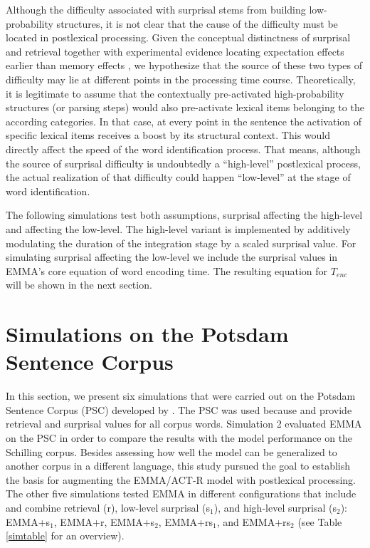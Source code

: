 Although the difficulty associated with surprisal stems from building low-probability structures, it is not clear that the cause of the difficulty must be located in postlexical processing.
Given the conceptual distinctness of surprisal and retrieval together with experimental evidence locating expectation effects earlier than memory effects \citep{Staub2010a,Vasishth2011}, we hypothesize that the source of these two types of difficulty may lie at different points in the processing time course.
Theoretically, it is legitimate to assume that the contextually pre-activated high-probability structures (or parsing steps) would also pre-activate lexical items belonging to the according categories. In that case, at every point in the sentence the activation of specific lexical items receives a boost by its structural context. This would directly affect the speed of the word identification process.
That means, although the source of surprisal difficulty is undoubtedly a ``high-level'' postlexical process, the actual realization of that difficulty could happen ``low-level'' at the stage of word identification.

The following simulations test both assumptions, surprisal affecting the  high-level and affecting the  low-level.  The high-level variant is implemented by additively modulating the duration of the integration stage by a scaled surprisal value. For simulating surprisal affecting the low-level we include the surprisal values in EMMA's core equation of word encoding time. The resulting equation for $T_{enc}$ will be shown in the next section.

\section{Simulations on the Potsdam Sentence Corpus} \label{sec:topics:psc}

In this section, we present six simulations that were carried out on the Potsdam Sentence Corpus (PSC) developed by \cite{Kliegl2004}. The PSC was used because \cite{Boston2008} and \cite{BostonHaleVasishth2011} provide retrieval and surprisal values for all corpus words.  Simulation 2 evaluated EMMA on the PSC in order to compare the results with the model performance on the Schilling corpus.  Besides assessing how well the model can be generalized to another corpus in a different language, this study pursued the goal to establish the basis for augmenting the EMMA/ACT-R model with postlexical processing. 
The other five simulations tested EMMA in different configurations that include and combine retrieval (r), low-level surprisal (s$_1$), and high-level surprisal (s$_2$): EMMA+s$_1$, EMMA+r, EMMA+s$_2$, EMMA+rs$_1$, and EMMA+rs$_2$ (see Table \ref{simtable} for an overview).

